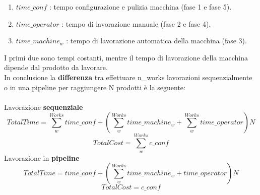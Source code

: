 \begin{enumerate}
    \item \(time\_conf\) : tempo configurazione e pulizia macchina (fase 1 e fase 5).
    \item \(time\_operator\) : tempo di lavorazione manuale (fase 2 e fase 4).
    \item \(time\_machine_w\) : tempo di lavorazione automatica della macchina (fase 3).
\end{enumerate}
I primi due sono tempi costanti, mentre il tempo di lavorazione della macchina dipende dal prodotto da lavorare.\\
In conclusione la \textbf{differenza} tra effettuare n\_works lavorazioni sequenzialmente o in una pipeline per raggiungere N prodotti è la seguente:\\ \\
Lavorazione \textbf{sequenziale}\\ 
\begin{equation} \label{eq:TotalTimeSeq}
TotalTime = \sum_{w}^{Works} time\_conf + \left( \sum_{w}^{Works} time\_machine_w + \sum_{w}^{Works} time\_operator \right)N  
\end{equation}
\begin{equation} \label{eq:TotalCostSeq}
    TotalCost = \sum_{w}^{Works} c\_conf
\end{equation}
Lavorazione in \textbf{pipeline}\\ 
\begin{equation} \label{eq:TotalTimePipeline}
    TotalTime = time\_conf + \left( \sum_{w}^{Works} time\_machine_w + time\_operator \right) N
\end{equation}
\begin{equation} \label{eq:TotalCostPipeline}
    TotalCost = c\_conf
\end{equation}
